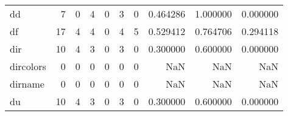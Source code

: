 \begin{longtable}{lrrrrrrrrr}
dd        &                                                  7 &                                                  0 &                                                  4 &                                                  0 &                                                  3 &                                                  0 &                                           0.464286 &                               1.000000 &                             0.000000 \\
df        &                                                 17 &                                                  4 &                                                  4 &                                                  0 &                                                  4 &                                                  5 &                                           0.529412 &                               0.764706 &                             0.294118 \\
dir       &                                                 10 &                                                  4 &                                                  3 &                                                  0 &                                                  3 &                                                  0 &                                           0.300000 &                               0.600000 &                             0.000000 \\
dircolors &                                                  0 &                                                  0 &                                                  0 &                                                  0 &                                                  0 &                                                  0 &                                                NaN &                                    NaN &                                  NaN \\
dirname   &                                                  0 &                                                  0 &                                                  0 &                                                  0 &                                                  0 &                                                  0 &                                                NaN &                                    NaN &                                  NaN \\
du        &                                                 10 &                                                  4 &                                                  3 &                                                  0 &                                                  3 &                                                  0 &                                           0.300000 &                               0.600000 &                             0.000000 \\

\end{longtable}
